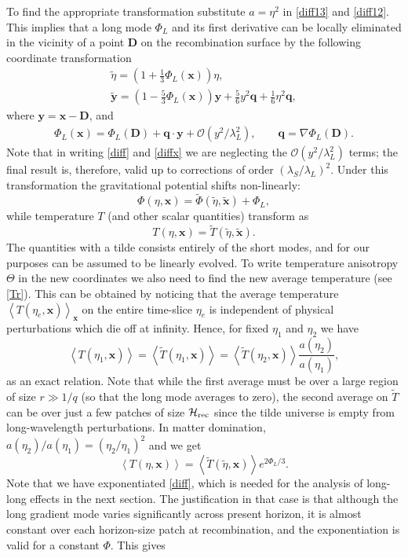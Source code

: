\documentclass[12pt]{article}
\numberwithin{equation}{section}
\def\bsb{\boldsymbol}
\def\bea{\begin{eqnarray}}
\def\eea{\end{eqnarray}}
\def\be{\begin{equation}}
\def\ee{\end{equation}}
\def\O{\mathcal{O}}
\def\cH{\mathcal{H}}
\def\x{{\bsb x}}
\newcommand{\expect}[1]{\left\langle #1 \right\rangle}
\begin{document}
To find the appropriate transformation substitute $a=\eta^2$ in \eqref{diff13} and \eqref{diff12}. This implies that a long mode $\Phi_L$ and its first derivative can be locally eliminated in the vicinity of a point $\bsb D$ on the recombination surface by the following coordinate transformation
\bea
\label{diff}
\tilde\eta = (1+\frac{1}{3}\Phi_L(\bsb x))\eta,~~~~~~~~~~~~~~~~~~~~~\\
\label{diffx}
\bsb{\tilde y}=(1-\frac{5}{3}\Phi_L(\bsb x))\bsb y+\frac{5}{6} y^2 \bsb q 
+\frac{1}{6}\eta^2 \bsb q,
\eea
where $\bsb y = \bsb x -\bsb D$, and
\bea
\label{phi}
\Phi_L(\bsb x)=\Phi_L(\bsb D)+\bsb q \cdot \bsb y +\O(y^2/\lambda_L^2),\qquad 
\bsb q = \nabla \Phi_L(\bsb D).
\eea
Note that in writing \eqref{diff} and \eqref{diffx} we are neglecting the $\O(y^2/\lambda_L^2)$ terms; the final result is, therefore, valid up to corrections of order $(\lambda_S/\lambda_L)^2$. Under this transformation the gravitational potential shifts non-linearly:
\be
\label{phi1}
\Phi(\eta,\bsb x)=\tilde\Phi(\tilde\eta,\bsb{\tilde {x}})+\Phi_L,
\ee
while temperature $T$ (and other scalar quantities) transform as
\be
T(\eta,\bsb x)=\tilde T(\tilde\eta,\bsb{\tilde {x}}).
\ee
The quantities with a tilde consists entirely of the short modes, and for our purposes can be assumed to be linearly evolved. To write temperature anisotropy $\Theta$ in the new coordinates we also need to find the new average temperature (see \eqref{Tr}). This can be obtained by noticing that the average temperature $\expect{T(\eta_e,\x)}_\x$ on the entire time-slice $\eta_e$ is independent of physical perturbations which die off at infinity. Hence, for fixed $\eta_1$ and $\eta_2$ we have 
\be
\expect{T(\eta_1,\bsb x)}=\expect{\tilde T(\eta_1,\bsb x)}=\expect{\tilde T(\eta_2,\bsb x)}\frac{a(\eta_2)}{a(\eta_1)},
\ee
as an exact relation. Note that while the first average must be over a large region of size $r\gg 1/q$ (so that the long mode averages to zero), the second average on $\tilde T$ can be over just a few patches of size $\cH_{\rm rec}$ since the tilde universe is empty from long-wavelength perturbations. In matter domination, $a(\eta_2)/a(\eta_1) = (\eta_2/\eta_1)^2$ and we get
\be
\label{Tphi}
\expect{T(\eta,\bsb x)}=\expect{\tilde T(\tilde \eta,\bsb x)} e^{2\Phi_L/3}.
\ee
Note that we have exponentiated \eqref{diff}, which is needed for the analysis of long-long effects in the next section. The justification in that case is that although the long gradient mode varies significantly across present horizon, it is almost constant over each horizon-size patch at recombination, and the exponentiation is valid for a constant $\Phi$. This gives
\end{document}
